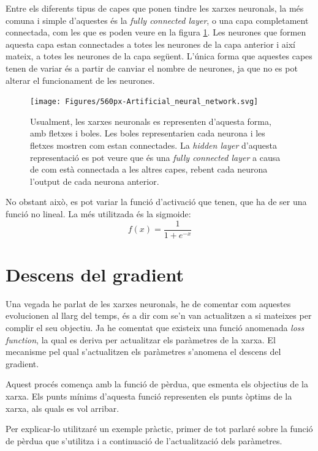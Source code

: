 Entre els diferents tipus de capes que ponen tindre les xarxes neuronals, la més comuna i simple d'aquestes és la \textit{fully connected layer}, o una capa completament connectada, com les que es poden veure en la figura \ref{fig:560px-artificialneuralnetwork}. Les neurones que formen aquesta capa estan connectades a totes les neurones de la capa anterior i així mateix, a totes les neurones de la capa següent. L'única forma que aquestes capes tenen de variar és a partir de canviar el nombre de neurones, ja que no es pot alterar el funcionament de les neurones.
\begin{figure}[H]
	\centering
	\texttt{[image: Figures/560px-Artificial\_neural\_network.svg]}
	\caption{Usualment, les xarxes neuronals es representen d'aquesta forma, amb fletxes i boles. Les boles representarien cada neurona i les fletxes mostren com estan connectades. La \textit{hidden layer} d'aquesta representació es pot veure que és una \textit{fully connected layer} a causa de com està connectada a les altres capes, rebent cada neurona l'output de cada neurona anterior.}
	\label{fig:560px-artificialneuralnetwork}
\end{figure}
No obstant això, es pot variar la funció d'activació que tenen, que ha de ser una funció no lineal. La més utilitzada és la sigmoide:
$$
f(x) = \frac{1}{1+e^{-x}}
$$

\section{Descens del gradient}
\label{gradient_descent}
Una vegada he parlat de les xarxes neuronals, he de comentar com aquestes evolucionen al llarg del temps, és a dir com se'n van actualitzen a si mateixes per complir el seu objectiu. Ja he comentat que existeix una funció anomenada \textit{loss function}, la qual es deriva per actualitzar els paràmetres de la xarxa. El mecanisme pel qual s'actualitzen els paràmetres s'anomena el descens del gradient.

Aquest procés comença amb la funció de pèrdua, que esmenta els objectius de la xarxa. Els punts mínims d'aquesta funció representen els punts òptims de la xarxa, als quals es vol arribar. 

 Per explicar-lo utilitzaré un exemple pràctic, primer de tot parlaré sobre la funció de pèrdua que s'utilitza i a continuació de l'actualització dels paràmetres. 
 
